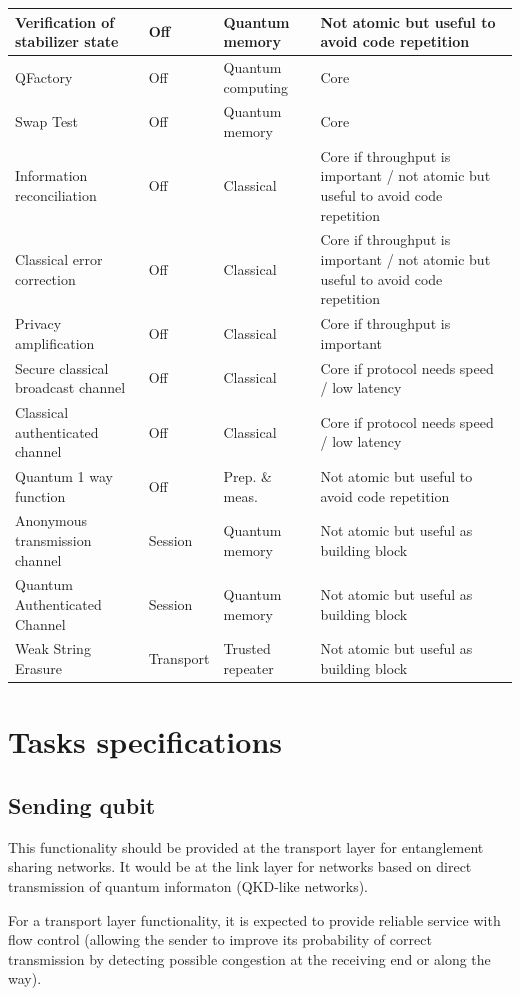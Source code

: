 \documentclass[11pt]{article}
\begin{document}
\begin{longtable}{p{}|p{}|p{}|p{}}
\hline
Verification of stabilizer state & Off & Quantum memory & Not atomic but useful to avoid code repetition\\
\hline
QFactory & Off & Quantum computing & Core\\
\hline
Swap Test & Off & Quantum memory & Core\\
\hline
Information reconciliation & Off & Classical & Core if throughput is important / not atomic but useful to avoid code repetition\\
\hline
Classical error correction & Off & Classical & Core if throughput is important / not atomic but useful to avoid code repetition\\
\hline
Privacy amplification & Off & Classical & Core if throughput is important\\
\hline
Secure classical broadcast channel & Off & Classical & Core if protocol needs speed / low latency\\
\hline
Classical authenticated channel & Off & Classical & Core if protocol needs speed / low latency\\
\hline
Quantum 1 way function & Off & Prep. \& meas. & Not atomic but useful to avoid code repetition\\
\hline
Anonymous transmission channel & Session & Quantum memory & Not atomic but useful as building block\\
\hline
Quantum Authenticated Channel & Session & Quantum memory & Not atomic but useful as building block\\
\hline
Weak String Erasure & Transport & Trusted repeater & Not atomic but useful as building block\\
\hline
\end{longtable}

\section{Tasks specifications}
\label{sec:orgd365217}
\subsection{Sending qubit}
\label{sec:org5ef081d}
This functionality should be provided at the transport layer for entanglement sharing networks. It would be at the link layer for networks based on direct transmission of quantum informaton (QKD-like networks).

For a transport layer functionality, it is expected to provide reliable service with flow control (allowing the sender to improve its probability of correct transmission by detecting possible congestion at the receiving end or along the way). 
\end{document}
